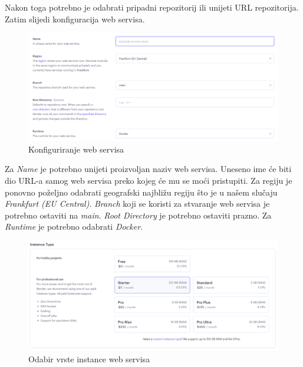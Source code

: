 			Nakon toga potrebno je odabrati pripadni repozitorij ili unijeti URL repozitorija. Zatim slijedi konfiguracija web servisa.
			
			\begin{figure}[H]
				\includegraphics[width=\textwidth]{slike/upute/konfiguriranjeWebServisa.png} %
				\caption{Konfiguriranje web servisa}
				\label{fig:konfiguriranjeWebServisa} %
			\end{figure}
			
			Za \textit{Name} je potrebno unijeti proizvoljan naziv web servisa. Uneseno ime će biti dio URL-a samog web servisa preko kojeg će mu se moći pristupiti. Za regiju je ponovno poželjno odabrati geografski najbližu regiju što je u našem slučaju \textit{Frankfurt (EU Central)}. \textit{Branch} koji se koristi za stvaranje web servisa je potrebno ostaviti na \textit{main}. \textit{Root Directory} je potrebno ostaviti prazno. Za \textit{Runtime} je potrebno odabrati \textit{Docker}.
			
			\begin{figure}[H]
				\includegraphics[width=\textwidth]{slike/upute/webServisPlacanje.png} %
				\caption{Odabir vrste instance web servisa}
				\label{fig:webServisPlacanje} %
			\end{figure}
			
